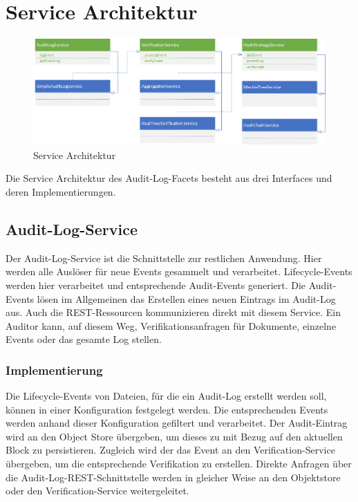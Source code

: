 \section{Service Architektur}


\begin{figure}[!htb]
	\includegraphics[width=1\textwidth]{content/pictures/services}
	\caption{Service Architektur}
	\label{fig:Services}
\end{figure}

Die Service Architektur des Audit-Log-Facets besteht aus drei Interfaces \label{fig:Services} und deren Implementierungen. 

\subsection{Audit-Log-Service}
Der Audit-Log-Service ist die Schnittstelle zur restlichen Anwendung. Hier werden alle Auslöser für neue Events gesammelt und verarbeitet. Lifecycle-Events werden hier verarbeitet und entsprechende Audit-Events generiert. Die Audit-Events lösen im Allgemeinen das Erstellen eines neuen Eintrags im Audit-Log aus. Auch die \acs{REST}-Ressourcen kommunizieren direkt mit diesem Service. Ein Auditor kann, auf diesem Weg, Verifikationsanfragen für Dokumente, einzelne Events oder das gesamte Log stellen. 

\subsubsection{Implementierung}
Die Lifecycle-Events von Dateien, für die ein Audit-Log erstellt werden soll, können in einer Konfiguration festgelegt werden. Die entsprechenden Events werden anhand dieser Konfiguration gefiltert und verarbeitet. Der Audit-Eintrag wird an den Object Store übergeben, um dieses zu mit Bezug auf den aktuellen Block zu persistieren. Zugleich wird der das Event an den Verification-Service übergeben, um die entsprechende Verifikation zu erstellen. Direkte Anfragen über die Audit-Log-REST-Schnittstelle werden in gleicher Weise an den Objektstore oder den Verification-Service weitergeleitet.

